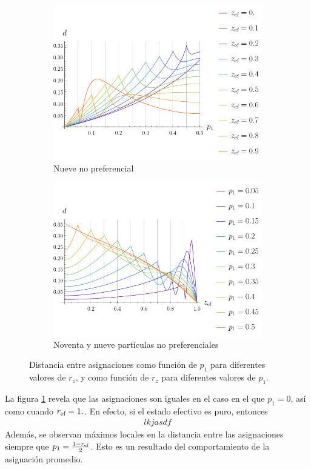 \begin{figure}[ht!]
    \centering
    \begin{subfigure}{0.5\textwidth}
      \centering
      \includegraphics[width=1.\linewidth]{appendices/figures/dist_maxent_avg_vs_p.png}
      \caption{Nueve no preferencial}
    \end{subfigure}%
    \begin{subfigure}{0.5\textwidth}
      \centering
      \includegraphics[width=1.\linewidth]{appendices/figures/dist_maxent_avg_vs_z.png}
      \caption{Noventa y nueve partículas no preferenciales}
    \end{subfigure}
    \caption{Distancia entre asignaciones como función de $p_{1}$ para diferentes valores de $r_{z}$, y como función de $r_{z}$ para diferentes valores de $p_{1}$. }\label{ap:DistAvgMaxEnt}
\end{figure}
La figura \ref{ap:DistAvgMaxEnt} revela que las asignaciones son iguales en el caso en el que $p_{1}=0$, así como cuando $r_{\text{ef}}=1.$. En efecto, si el estado efectivo es puro, entonces 
\begin{align}
    lkjasdf
\end{align}
Además, se observan máximos locales en la distancia entre las asignaciones siempre que $p_{1}=\frac{1-r_{\text{ef}}}{2}$. Esto es un resultado del comportamiento de la asignación promedio.

